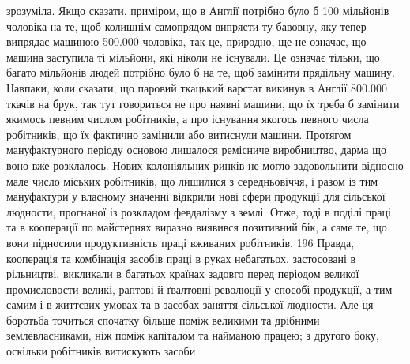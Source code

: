 зрозуміла. Якщо сказати, приміром, що в Англії потрібно було б
100 мільйонів чоловіка на те, щоб колишнім самопрядом випрясти
ту бавовну, яку тепер випрядає машиною 500.000 чоловіка, так це,
природно, ще не означає, що машина заступила ті мільйони, які
ніколи не існували. Це означає тільки, що багато мільйонів
людей потрібно було б на те, щоб замінити прядільну машину.
Навпаки, коли сказати, що паровий ткацький варстат викинув
в Англії 800.000 ткачів на брук, так тут говориться не про наявні
машини, що їх треба б замінити якимось певним числом робітників,
а про існування якогось певного числа робітників, що їх
фактично замінили або витиснули машини. Протягом мануфактурного
періоду основою лишалося ремісниче виробництво, дарма
що воно вже розклалось. Нових колоніяльних ринків не могло
задовольнити відносно мале число міських робітників, що лишилися
з середньовіччя, і разом із тим мануфактури у власному
значенні відкрили нові сфери продукції для сільської людности,
прогнаної із розкладом февдалізму з землі. Отже, тоді в поділі
праці та в кооперації по майстернях виразно виявився позитивний
бік, а саме те, що вони підносили продуктивність праці вживаних
робітників. 196 Правда, кооперація та комбінація засобів
праці в руках небагатьох, застосовані в рільництві, викликали
в багатьох країнах задовго перед періодом великої промисловости
великі, раптові й ґвалтовні революції у способі продукції, а тим
самим і в життєвих умовах та в засобах заняття сільської людности.
Але ця боротьба точиться спочатку більше поміж великими
та дрібними землевласниками, ніж поміж капіталом та найманою
працею; з другого боку, оскільки робітників витискують засоби

